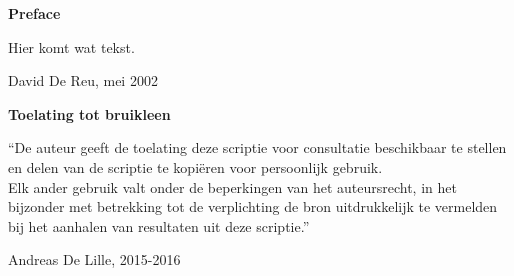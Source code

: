 
\newpage

\noindent \textbf{\huge Preface}

\vspace{1.5cm}

\noindent
Hier komt wat tekst.

\addvspace{4cm}

\noindent David De Reu, mei 2002\newpage

\noindent \textbf{\huge Toelating tot bruikleen}

\vspace{1.5cm}

\noindent
``De auteur geeft de toelating deze scriptie voor consultatie beschikbaar
te stellen en delen van de scriptie te kopi\"eren voor persoonlijk
gebruik.\\
Elk ander gebruik valt onder de beperkingen van het auteursrecht,
in het bijzonder met betrekking tot de verplichting de bron uitdrukkelijk
te vermelden bij het aanhalen van resultaten uit deze scriptie.''

\addvspace{4cm}

\noindent Andreas De Lille, 2015-2016
